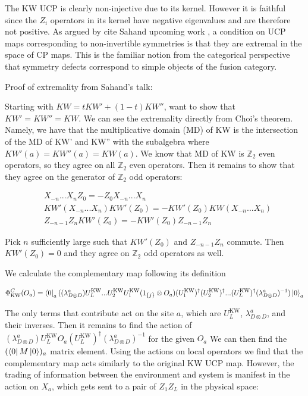 \documentclass{article}
\theoremstyle{definition}
\begin{document}
The KW UCP is clearly non-injective due to its kernel. However it is faithful since the $Z_i$ operators in its kernel have negative eigenvalues and are therefore not positive.   As argued by \color{brown}cite Sahand upcoming work \color{black}, a condition on UCP maps corresponding to non-invertible symmetries is that they are extremal in the space of CP maps.  This is the familiar notion from the categorical perspective that symmetry defects correspond to simple objects of the fusion category.


\color{blue}
Proof of extremality from Sahand's talk:

Starting with $KW = tKW' + (1-t)KW''$, want to show that $KW' = KW'' = KW$. We can see the extremality directly from Choi's theorem. Namely, we have that the multiplicative domain (MD) of KW is the intersection of the MD of KW' and KW'' with the subalgebra where $KW'(a) = KW''(a) = KW(a)$. We know that MD of KW is $\mathbb{Z}_2$ even operators, so they agree on all  $\mathbb{Z}_2$ even operators.  Then it remains to show that they agree on the generator of $\mathbb{Z}_2$ odd operators:

\begin{align}
    &X_{-n}...X_n Z_0 = -Z_0 X_{-n}...X_n\\
    & KW'(X_{-n}...X_n) KW'(Z_0) = -KW'(Z_0) KW(X_{-n}...X_n)\\
    & Z_{-n-1}Z_nKW'(Z_0) = -KW'(Z_0) Z_{-n-1}Z_n
\end{align}

Pick $n$ sufficiently large such that $KW'(Z_0)$ and $Z_{-n-1}Z_n$ commute.  Then $KW'(Z_0) = 0$ and they agree on $\mathbb{Z}_2$ odd operators as well.

\color{black}

We calculate the complementary map following its definition

\begin{equation}
    \Phi^C_{\text{KW}}(O_a) = \bra{0}_a((\lambda^{a}_{D\otimes D})U^{\text{KW}}_L...U^{\text{KW}}_2U^{\text{KW}}_1(1_{\{j\}} \otimes O_a)(U_1^\text{KW})^\dagger(U_2^\text{KW})^\dagger...(U_L^\text{KW})^\dagger(\lambda^{a}_{D\otimes D})^{-1})\ket{0}_a
\end{equation}


The only terms that contribute act on the site $a$, which are $U^{\text{KW}}_L$, $\lambda^{a}_{D\otimes D}$, and their inverses. Then it remains to find the action of $(\lambda^{a}_{D\otimes D})U^{\text{KW}}_LO_a(U_L^\text{KW})^\dagger(\lambda^{a}_{D\otimes D})^{-1}$ for the given $O_a$  We can then find the $(\bra{0}M\ket{0})_a$ matrix element.  Using the actions on local operators we find that the complementary map acts similarly to the original KW UCP map.  However, the trading of information between the environment and system is manifest in the action on $X_a$, which gets sent to a pair of $Z_1Z_L$ in the physical space:
\end{document}
